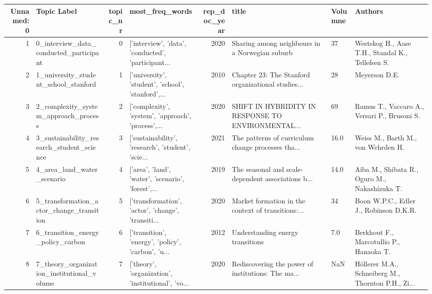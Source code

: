 \begin{tabular}{rlrlrlll}
\toprule
 Unnamed: 0 &                                        Topic Label &  topic\_nr &                                    most\_freq\_words &  rep\_doc\_year &                                              title & Volumne &                                            Authors \\
\midrule
          1 &             0\_interview\_data\_conducted\_participant &         0 & ['interview', 'data', 'conducted', 'participant... &          2020 &     Sharing among neighbours in a Norwegian suburb &      37 &   Westskog H., Aase T.H., Standal K., Tellefsen S. \\
          2 &               1\_university\_student\_school\_stanford &         1 & ['university', 'student', 'school', 'stanford',... &          2010 & Chapter 23: The Stanford organizational studies... &      28 &                                      Meyerson D.E. \\
          3 &               2\_complexity\_system\_approach\_process &         2 & ['complexity', 'system', 'approach', 'process',... &          2020 & SHIFT IN HYBRIDITY IN RESPONSE TO ENVIRONMENTAL... &      69 &       Ramus T., Vaccaro A., Versari P., Brusoni S. \\
          4 &          3\_sustainability\_research\_student\_science &         3 & ['sustainability', 'research', 'student', 'scie... &          2021 & The patterns of curriculum change processes tha... &    16.0 &                 Weiss M., Barth M., von Wehrden H. \\
          5 &                         4\_area\_land\_water\_scenario &         4 & ['area', 'land', 'water', 'scenario', 'forest',... &          2019 & The seasonal and scale-dependent associations b... &    14.0 &      Aiba M., Shibata R., Oguro M., Nakashizuka T. \\
          6 &           5\_transformation\_actor\_change\_transition &         5 & ['transformation', 'actor', 'change', 'transiti... &          2020 & Market formation in the context of transitions:... &      34 &             Boon W.P.C., Edler J., Robinson D.K.R. \\
          7 &                  6\_transition\_energy\_policy\_carbon &         6 & ['transition', 'energy', 'policy', 'carbon', 'u... &          2012 &                   Understanding energy transitions &     7.0 &            Berkhout F., Marcotullio P., Hanaoka T. \\
          8 &         7\_theory\_organization\_institutional\_volume &         7 & ['theory', 'organization', 'institutional', 'vo... &          2020 & Rediscovering the power of institutions: The ma... &     NaN & Höllerer M.A., Schneiberg M., Thornton P.H., Zi... \\

\end{tabular}
